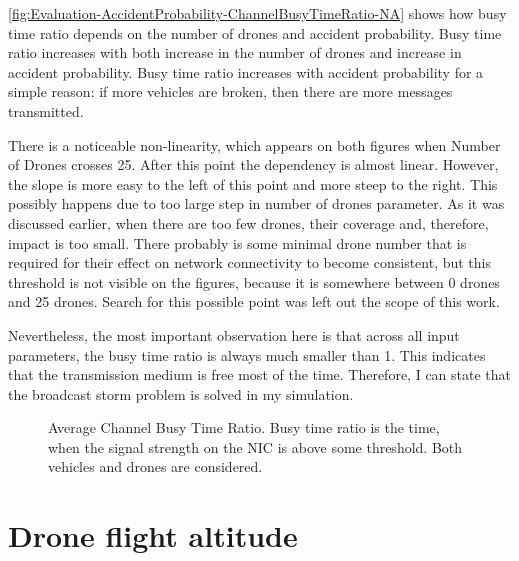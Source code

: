 \documentclass[]{nsm-thesis}
\begin{document}
\cref{fig:Evaluation-AccidentProbability-ChannelBusyTimeRatio-NA} shows how busy time ratio depends on the number of drones and accident probability.
Busy time ratio increases with both increase in the number of drones and increase in accident probability. Busy time ratio increases with accident probability for a simple reason: if more vehicles are broken, then there are more messages transmitted.

There is a noticeable non-linearity, which appears on both figures when Number of Drones crosses 25. After this point the dependency is almost linear. However, the slope is more easy to the left of this point and more steep to the right. This possibly happens due to too large step in number of drones parameter. As it was discussed earlier, when there are too few drones, their coverage and, therefore, impact is too small. There probably is some minimal drone number that is required for their effect on network connectivity to become consistent, but this threshold is not visible on the figures, because it is somewhere between 0 drones and 25 drones. Search for this possible point was left out the scope of this work.

Nevertheless, the most important observation here is that across all input parameters, the busy time ratio is always much smaller than 1. This indicates that the transmission medium is free most of the time. Therefore, I can state that the broadcast storm problem is solved in my simulation.



\begin{figure}%
	\centering
	\hfill
	\hfill
	\caption{Average Channel Busy Time Ratio. Busy time ratio is the time, when the signal strength on the \ac{NIC} is above some threshold. Both vehicles and drones are considered.}%
	\label{fig:Evaluation-ChannelBusyTimeRatio}%
\end{figure}



\section{Drone flight altitude}
\end{document}
